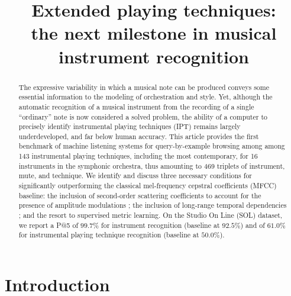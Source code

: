 \documentclass{article}
\title{Extended playing techniques: \\
the next milestone in musical instrument recognition}
\begin{document}
%
\maketitle


\begin{abstract}
The expressive variability in which a musical note can be produced conveys some
essential information to the modeling of orchestration and style. Yet, although
the automatic recognition of a musical instrument from the recording of a
single ``ordinary'' note is now considered a solved problem, the ability of a
computer to precisely identify instrumental playing techniques (IPT) remains largely
underdeveloped, and far below human accuracy. This article provides the first
benchmark of machine listening systems for query-by-example browsing among
among 143 instrumental playing techniques, including the most contemporary, for
16 instruments in the symphonic orchestra, thus amounting to 469 triplets of
instrument, mute, and technique. We identify and discuss three necessary
conditions for significantly outperforming the classical mel-frequency cepstral
coefficients (MFCC) baseline: the inclusion of second-order scattering
coefficients to account for the presence of amplitude modulations ; the
inclusion of long-range temporal dependencies ; and the resort to supervised
metric learning. On the Studio On Line (SOL) dataset, we report a P@5 of $99.7\%$
for instrument recognition (baseline at $92.5\%$) and of $61.0\%$ for instrumental playing technique recognition (baseline at $50.0\%$).
\end{abstract}



\section{Introduction}\label{sec:introduction}
\end{document}
